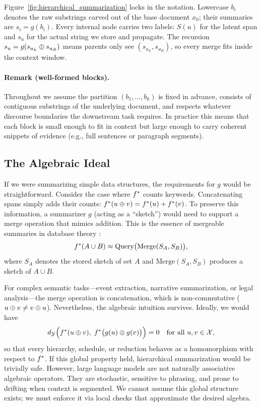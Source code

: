 Figure~\ref{fig:hierarchical_summarization} locks in the notation. Lowercase $b_i$ denotes the raw substrings carved out of the base document $x_0$; their summaries are $s_i = g(b_i)$. Every internal node carries two labels: $S(u)$ for the latent span and $s_u$ for the actual string we store and propagate. The recursion $s_u = g(s_{u_L} \oplus s_{u_R})$ means parents only see $(s_{u_L}, s_{u_R})$, so every merge fits inside the context window.

\paragraph{Remark (well-formed blocks).}
Throughout we assume the partition $(b_1, \ldots, b_k)$ is fixed in advance, consists of contiguous substrings of the underlying document, and respects whatever discourse boundaries the downstream task requires. In practice this means that each block is small enough to fit in context but large enough to carry coherent snippets of evidence (e.g., full sentences or paragraph segments).

\subsection{The Algebraic Ideal}

If we were summarizing simple data structures, the requirements for $g$ would be straightforward. Consider the case where $f^{\ast}$ counts keywords. Concatenating spans simply adds their counts: $f^{\ast}(u \oplus v) = f^{\ast}(u) + f^{\ast}(v)$. To preserve this information, a summarizer $g$ (acting as a ``sketch'') would need to support a merge operation that mimics addition. This is the essence of mergeable summaries in database theory \citep{Agarwal2013MergeableTODS}:
\[
f^{\ast}(A \cup B) \approx \text{Query}\big(\text{Merge}(S_A, S_B)\big),
\]
where $S_A$ denotes the stored sketch of set $A$ and $\text{Merge}(S_A, S_B)$ produces a sketch of $A \cup B$.

For complex semantic tasks---event extraction, narrative summarization, or legal analysis---the merge operation is concatenation, which is non-commutative ($u \oplus v \neq v \oplus u$). Nevertheless, the algebraic intuition survives. Ideally, we would have
\[
d_{\mathcal{Y}}\Big(f^{\ast}(u \oplus v), \;f^{\ast}\big(g(u) \oplus g(v)\big)\Big) = 0 \quad \text{for all } u, v \in \mathcal{X},
\]
so that every hierarchy, schedule, or reduction behaves as a homomorphism with respect to $f^{\ast}$. If this global property held, hierarchical summarization would be trivially safe. However, large language models are not naturally associative algebraic operators. They are stochastic, sensitive to phrasing, and prone to drifting when context is segmented. We cannot assume this global structure exists; we must enforce it via local checks that approximate the desired algebra.

